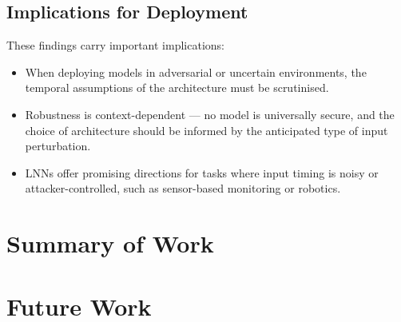 \subsection*{Implications for Deployment}

These findings carry important implications:
\begin{itemize}
    \item When deploying models in adversarial or uncertain environments, the temporal assumptions of the architecture must be scrutinised.
    \item Robustness is context-dependent — no model is universally secure, and the choice of architecture should be informed by the anticipated type of input perturbation.
    \item LNNs offer promising directions for tasks where input timing is noisy or attacker-controlled, such as sensor-based monitoring or robotics.
\end{itemize}



\section{Summary of Work}


\section{Future Work}